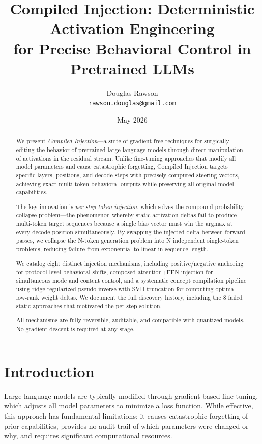 \documentclass[11pt,a4paper]{article}
\title{Compiled Injection: Deterministic Activation Engineering\\ for Precise Behavioral Control in Pretrained LLMs}
\author{Douglas Rawson\\ \texttt{rawson.douglas@gmail.com}}
\date{May 2026}
\begin{document}
\maketitle

\begin{abstract}
We present \emph{Compiled Injection}---a suite of gradient-free techniques for surgically editing the behavior of pretrained large language models through direct manipulation of activations in the residual stream. Unlike fine-tuning approaches that modify all model parameters and cause catastrophic forgetting, Compiled Injection targets specific layers, positions, and decode steps with precisely computed steering vectors, achieving exact multi-token behavioral outputs while preserving all original model capabilities.

The key innovation is \emph{per-step token injection}, which solves the compound-probability collapse problem---the phenomenon whereby static activation deltas fail to produce multi-token target sequences because a single bias vector must win the argmax at every decode position simultaneously. By swapping the injected delta between forward passes, we collapse the N-token generation problem into N independent single-token problems, reducing failure from exponential to linear in sequence length.

We catalog eight distinct injection mechanisms, including positive/negative anchoring for protocol-level behavioral shifts, composed attention+FFN injection for simultaneous mode and content control, and a systematic concept compilation pipeline using ridge-regularized pseudo-inverse with SVD truncation for computing optimal low-rank weight deltas. We document the full discovery history, including the 8 failed static approaches that motivated the per-step solution.

All mechanisms are fully reversible, auditable, and compatible with quantized models. No gradient descent is required at any stage.
\end{abstract}

\section{Introduction}

Large language models are typically modified through gradient-based fine-tuning, which adjusts all model parameters to minimize a loss function. While effective, this approach has fundamental limitations: it causes catastrophic forgetting of prior capabilities, provides no audit trail of which parameters were changed or why, and requires significant computational resources.
\end{document}
